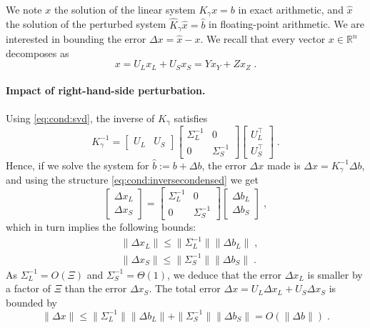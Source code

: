 We note $x$ the solution of the linear system $K_\gamma x = b$
in exact arithmetic, and $\widehat{x}$ the solution of
the perturbed system $\widehat{K}_\gamma \widehat{x} = \widehat{b}$
in floating-point arithmetic. We are interested in bounding
the error $\Delta x = \widehat{x} - x$. We
recall that every vector $x \in \mathbb{R}^n$ decomposes as
\begin{equation}
  x = U_L x_L + U_S x_S = Y x_Y + Z x_Z \; .
\end{equation}

\paragraph{Impact of right-hand-side perturbation.}
Using \eqref{eq:cond:svd}, the inverse of
$K_\gamma$ satisfies
\begin{equation}
  \label{eq:cond:inversecondensed}
  K_\gamma^{-1}  = \begin{bmatrix} U_L & U_S \end{bmatrix}
  \begin{bmatrix}
    \Sigma_L^{-1} & 0 \\ 0 & \Sigma_S^{-1}
  \end{bmatrix}
  \begin{bmatrix}
    U_L^\top \\ U_S^\top
  \end{bmatrix}
  \; .
\end{equation}
Hence, if we solve the system for $\widehat{b} := b + \Delta b$,
the error $\Delta x$ made is $\Delta x = K_\gamma^{-1} \Delta b$,
and using the structure \eqref{eq:cond:inversecondensed} we get
\begin{equation}
  \begin{bmatrix}
    \Delta x_L \\ \Delta x_S
  \end{bmatrix}
  =
  \begin{bmatrix}
    \Sigma_L^{-1} & 0 \\ 0 & \Sigma_S^{-1}
  \end{bmatrix}
  \begin{bmatrix}
    \Delta b_L \\ \Delta b_S
  \end{bmatrix}
  \; ,
\end{equation}
which in turn implies the following bounds:
\begin{equation}
  \label{eq:cond:rhserror}
  \begin{aligned}
    & \| \Delta x_L \| \leq \| \Sigma_L^{-1} \| \| \Delta b_L \| \; ,\\
    & \| \Delta x_S \| \leq \| \Sigma_S^{-1} \| \| \Delta b_S \| \; .
  \end{aligned}
\end{equation}
As $\Sigma_L^{-1} = O(\Xi)$ and $\Sigma_S^{-1} = \Theta(1)$,
we deduce that the error $\Delta x_L$ is smaller by a factor
of $\Xi$ than the error $\Delta x_S$. The total error
$\Delta x = U_L \Delta x_L + U_S \Delta x_S$ is bounded by
\begin{equation}
  \label{eq:cond:rhserrorfull}
  \| \Delta x \|
  \leq  \| \Sigma_L^{-1} \| \| \Delta b_L \| + \| \Sigma_S^{-1} \| \| \Delta b_S \| =
  O(\|\Delta b \|) \; .
\end{equation}

